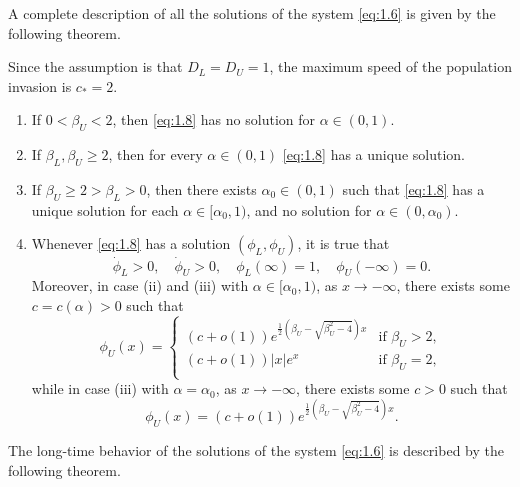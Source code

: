 A complete description of all the solutions of the system \eqref{eq:1.6} is given by the following theorem.

\begin{theorem}
    Since the assumption is that \(D_L = D_U = 1\), the maximum speed of the population invasion is \(c_* = 2\). 
    \begin{enumerate}[label=(\roman*)]
        \item If \(0 < \beta_U < 2\), then \eqref{eq:1.8} has no solution for \(\alpha \in (0, 1)\). 
        \item If \(\beta_L, \beta_U \geq 2\), then for every \(\alpha \in (0, 1)\) \eqref{eq:1.8} has a unique solution.
        \item If \(\beta_U \geq 2 > \beta_L > 0\), then there exists \(\alpha_0 \in (0, 1)\) such that \eqref{eq:1.8} has a unique solution for each \(\alpha \in [\alpha_0, 1)\), and no solution for \(\alpha \in (0, \alpha_0)\).
        \item  Whenever \eqref{eq:1.8} has a solution \((\phi_L, \phi_U)\), it is true that 
        \[
            \dot{\phi}_L > 0, \quad \dot{\phi}_U > 0, \quad \phi_L(\infty) = 1, \quad \phi_U(-\infty) = 0.
        \]
        Moreover, in case (ii) and (iii) with \(\alpha \in [\alpha_0, 1)\), as \(x \to -\infty\), there exists some \(c = c(\alpha) > 0\) such that
        \begin{equation}
            \phi_U(x) = \begin{cases}
                (c + o(1))e^{\frac{1}{2}(\beta_U - \sqrt{\beta_U^2 - 4})x} & \text{if } \beta_U > 2, \\
                (c + o(1))\lvert x\rvert e^{x} & \text{if } \beta_U = 2, \\
            \end{cases} 
            \label{eq:1.9}
        \end{equation}
        while in case (iii) with \(\alpha = \alpha_0\), as \(x \to -\infty\), there exists some \(c > 0\) such that
        \begin{equation}
            \phi_U(x) = (c + o(1))e^{\frac{1}{2}(\beta_U - \sqrt{\beta_U^2 - 4})x}.
            \label{eq:1.10}
        \end{equation}
    \end{enumerate}
    \label{thm:1.1}
\end{theorem}
The long-time behavior of the solutions of the system \eqref{eq:1.6} is described by the following theorem.
